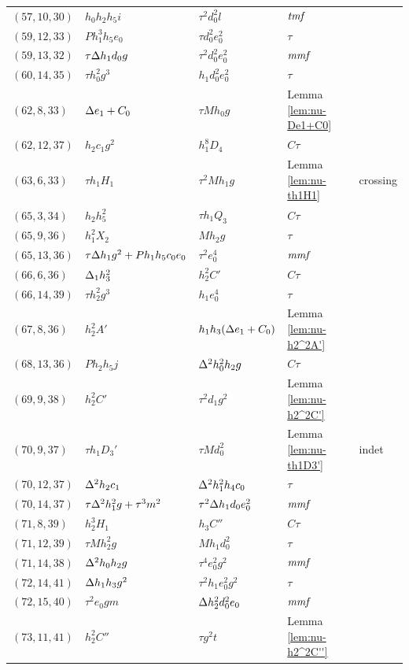 \begin{longtable}{lllll}
$(57, 10, 30)$ & $h_0 h_2 h_5 i$ & $\tau^2 d_0^2 l$ & $\textit{tmf}$ \\
$(59, 12, 33)$ & $P h_1^3 h_5 e_0$ & $\tau d_0^2 e_0^2$ & $\tau$ \\
$(59, 13, 32)$ & $\tau \Delta h_1 d_0 g$ & $\tau^2 d_0^2 e_0^2$ & $\textit{mmf}$ \\
$(60, 14, 35)$ & $\tau h_0^2 g^3$ & $h_1 d_0^2 e_0^2$ & $\tau$ \\
$(62, 8, 33)$ & $\Delta e_1 + C_0$ & $\tau M h_0 g$ & Lemma \ref{lem:nu-De1+C0} \\
$(62, 12, 37)$ & $h_2 c_1 g^2$ & $h_1^8 D_4$ & $C\tau$ \\
$(63, 6, 33)$ & $\tau h_1 H_1$ & $\tau^2 M h_1 g$ & Lemma \ref{lem:nu-th1H1} & crossing \\
$(65, 3, 34)$ & $h_2 h_5^2$ & $\tau h_1 Q_3$ & $C\tau$ & \\ 
$(65, 9, 36)$ & $h_1^2 X_2$ & $M h_2 g$ & $\tau$ \\
$(65, 13, 36)$ & $\tau \Delta h_1 g^2 + P h_1 h_5 c_0 e_0$ & $\tau^2 e_0^4$ & $\textit{mmf}$ \\
$(66, 6, 36)$ & $\Delta_1 h_3^2$ & $h_2^2 C'$ & $C\tau$ \\
$(66, 14, 39)$ & $\tau h_2^2 g^3$ & $h_1 e_0^4$ & $\tau$ \\
$(67, 8, 36)$ & $h_2^2 A'$ & $h_1 h_3 (\Delta e_1 + C_0)$ & Lemma \ref{lem:nu-h2^2A'} \\
$(68, 13, 36)$ & $P h_2 h_5 j$ & $\Delta^2 h_0^2 h_2 g$ & $C\tau$ \\
$(69, 9, 38)$ & $h_2^2 C'$ & $\tau^2 d_1 g^2$ & Lemma \ref{lem:nu-h2^2C'} & \\ 
$(70, 9, 37)$ & $\tau h_1 D_3'$ & $\tau M d_0^2$ & Lemma \ref{lem:nu-th1D3'} & indet \\
$(70, 12, 37)$ & $\Delta^2 h_2 c_1$ & $\Delta^2 h_1^2 h_4 c_0$ & $\tau$ \\
$(70, 14, 37)$ & $\tau \Delta^2 h_1^2 g + \tau^3 m^2$ & $\tau^2 \Delta h_1 d_0 e_0^2$ & $\textit{mmf}$ \\
$(71, 8, 39)$ & $h_2^3 H_1$ & $h_3 C''$ & $C\tau$ \\
$(71, 12, 39)$ & $\tau M h_2^2 g$ & $M h_1 d_0^2$ & $\tau$ \\
$(71, 14, 38)$ & $\Delta^2 h_0 h_2 g$ & $\tau^4 e_0^2 g^2$ & $\textit{mmf}$ \\
$(72, 14, 41)$ & $\Delta h_1 h_3 g^2$ & $\tau^2 h_1 e_0^2 g^2$ & $\tau$ \\
$(72, 15, 40)$ & $\tau^2 e_0 g m$ & $\Delta h_2^2 d_0^2 e_0$ & $\textit{mmf}$ \\
$(73, 11, 41)$ & $h_2^2 C''$ & $\tau g^2 t$ & Lemma \ref{lem:nu-h2^2C''} \\

\end{longtable}
